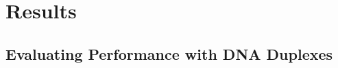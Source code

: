\documentclass[10pt]{article}
\begin{document}




\section*{Results}

\subsection*{Evaluating Performance with DNA Duplexes}
\end{document}
